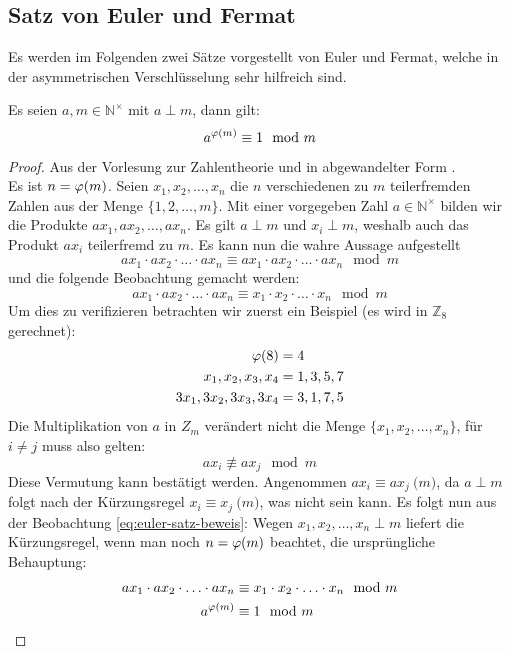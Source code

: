 \subsection{Satz von Euler und Fermat}
Es werden im Folgenden zwei Sätze vorgestellt von Euler und Fermat, welche
in der asymmetrischen Verschlüsselung sehr hilfreich sind.
\begin{satz}
  Es seien $a,m \in \mathbb{N}^\times$ mit $a \perp m$, dann gilt:
  \begin{equation*}
    a^{\varphi(m)} \equiv 1 \mod{m}
  \end{equation*}
\end{satz}
\begin{proof}
  Aus der Vorlesung zur Zahlentheorie \parencite{SITE:phi-euler-fermat} und in
  abgewandelter Form \parencite[187-188]{BOOK:numberTheory}. \\
  Es ist $n = \varphi(m)$. Seien $x_1,x_2,\ldots,x_n$ die $n$ verschiedenen zu
  $m$ teilerfremden Zahlen aus der Menge $\{1,2,\ldots,m\}$. Mit einer vorgegeben Zahl
  $a \in \mathbb{N}^\times$ bilden wir die Produkte $ax_1,ax_2,\ldots,ax_n$.
  Es gilt $a \perp m$ und $x_i \perp m$, weshalb auch das Produkt $ax_i$ teilerfremd zu $m$.
  Es kann nun die wahre Aussage aufgestellt
  \begin{equation*}
    ax_1 \cdot ax_2 \cdot \ldots \cdot ax_n \equiv
    ax_1 \cdot ax_2 \cdot \ldots \cdot ax_n \mod{m}
  \end{equation*}
  und die folgende Beobachtung gemacht werden:
  \begin{equation*}
    \label{eq:euler-satz-beweis}
    ax_1 \cdot ax_2 \cdot \ldots \cdot ax_n \equiv
    x_1 \cdot x_2 \cdot \ldots \cdot x_n  \mod{m} \tag{$\ast$}
  \end{equation*}
  Um dies zu verifizieren betrachten wir zuerst ein Beispiel (es wird in $\mathbb{Z}_8$ gerechnet):
  \begin{align*}
    \varphi(8)            & = 4       \\
    x_1,x_2,x_3,x_4     & = 1,3,5,7 \\
    3x_1,3x_2,3x_3,3x_4 & = 3,1,7,5
  \end{align*}
  Die Multiplikation von $a$ in $Z_m$ verändert nicht die Menge $\{x_1,x_2,\ldots,x_n\}$,
  für $i \neq j$ muss also gelten:
  \begin{equation*}
    ax_i \not\equiv ax_j \mod{m}
  \end{equation*}
  Diese Vermutung kann bestätigt werden. Angenommen
  $ax_i \equiv ax_j \pod{m}$, da $a \perp m$ folgt nach der Kürzungsregel
  $x_i \equiv x_j \pod{m}$, was nicht sein kann.
  Es folgt nun aus der Beobachtung \eqref{eq:euler-satz-beweis}:
  Wegen $x_1,x_2,\ldots,x_n \perp m$ liefert die Kürzungsregel, wenn man noch
  $n = \varphi(m)$ beachtet, die ursprüngliche Behauptung:
  \begin{align*}
    ax_1 \cdot ax_2 \cdot \ldots \cdot ax_n & \equiv
    x_1 \cdot x_2 \cdot \ldots \cdot x_n  \mod{m}              \\
    a^{\varphi(m)}                            & \equiv 1 \mod{m}
  \end{align*}
\end{proof}

